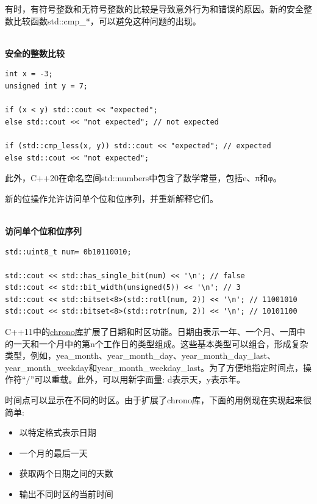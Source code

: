 
有时，有符号整数和无符号整数的比较是导致意外行为和错误的原因。新的安全整数比较函数std::cmp\_*，可以避免这种问题的出现。

\hspace*{\fill} \\ %
\noindent
\textbf{安全的整数比较}
\begin{lstlisting}[style=styleCXX]
int x = -3;
unsigned int y = 7;

if (x < y) std::cout << "expected";
else std::cout << "not expected"; // not expected

if (std::cmp_less(x, y)) std::cout << "expected"; // expected
else std::cout << "not expected";
\end{lstlisting}

此外，C++20在命名空间std::numbers中包含了数学常量，包括e、π和φ。

新的位操作允许访问单个位和位序列，并重新解释它们。

\hspace*{\fill} \\ %
\noindent
\textbf{访问单个位和位序列}
\begin{lstlisting}[style=styleCXX]
std::uint8_t num= 0b10110010;

std::cout << std::has_single_bit(num) << '\n'; // false
std::cout << std::bit_width(unsigned(5)) << '\n'; // 3
std::cout << std::bitset<8>(std::rotl(num, 2)) << '\n'; // 11001010
std::cout << std::bitset<8>(std::rotr(num, 2)) << '\n'; // 10101100
\end{lstlisting}


C++11中的\href{https://en.cppreference.com/w/cpp/chrono}{chrono库}扩展了日期和时区功能。日期由表示一年、一个月、一周中的一天和一个月中的第n个工作日的类型组成。这些基本类型可以组合，形成复杂类型，例如，yea\_month、year\_month\_day、year\_month\_day\_last、year\_month\_weekday和year\_month\_weekday\_last。为了方便地指定时间点，操作符“/”可以重载。此外，可以用新字面量: d表示天，y表示年。

时间点可以显示在不同的时区。由于扩展了chrono库，下面的用例现在实现起来很简单:

\begin{itemize}
\item 
以特定格式表示日期

\item 
一个月的最后一天

\item 
获取两个日期之间的天数

\item 
输出不同时区的当前时间
\end{itemize}

